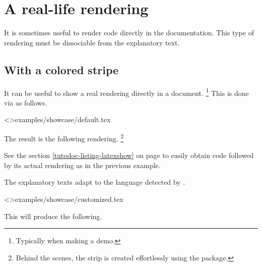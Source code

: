 \documentclass{tutodoc}
\begin{document}
\section{A real-life rendering}
\label{tutodoc-showcase}

It is sometimes useful to render code directly in the documentation. This type of rendering must be dissociable from the explanatory text.



\subsection{With a colored stripe}

\begin{tdocexa} 
    It can be useful to show a real rendering directly in a document.%
    \footnote{
        Typically when making a demo.
    }
    This is done via  as follows.

    \tdoclatexinput<>{examples/showcase/default.tex}

    The result is the following rendering.%
    \footnote{
        Behind the scenes, the strip is created effortlessly using the  package.
    }
\end{tdocexa}




\smallskip

\begin{tdocrem}
    See the section \ref{tutodoc-listing-latexshow} on page \pageref{tutodoc-listing-latexshow} to easily obtain code followed by its actual rendering as in the previous example.
\end{tdocrem}


\begin{tdocnote}
    The explanatory texts adapt to the language detected by \thisproj.
\end{tdocnote}




\begin{tdocexa}
    \leavevmode

    \tdoclatexinput<>{examples/showcase/customized.tex}

    This will produce the following.

    \medskip

    
\end{tdocexa}
\end{document}
